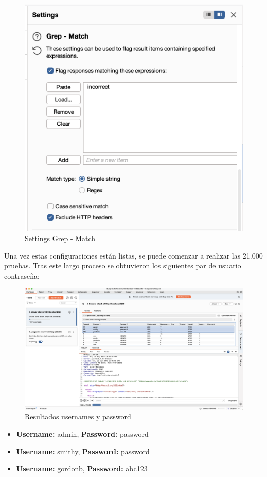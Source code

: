 \documentclass[letter,12pt]{article}
\begin{document}
\begin{itemize}
    \begin{figure}[H]
        \centering
        \includegraphics[width=0.5\linewidth]{Imagenes/brute_force_settings_match.png}
        \caption{Settings Grep - Match}
        \label{fig:placeholder}
    \end{figure}
\end{itemize}
Una vez estas configuraciones están listas, se puede comenzar a realizar las 21.000 pruebas.
Tras este largo proceso se obtuvieron los siguientes par de usuario contraseña:
\begin{figure}[H]
    \centering
    \includegraphics[width=1\linewidth]{Imagenes/brute_force_results.png}
    \caption{Resultados usernames y password}
    \label{fig:placeholder}
\end{figure}
\begin{itemize}
    \item \textbf{Username:} admin, \textbf{Password:} password
    \item \textbf{Username:} smithy, \textbf{Password:} password
    \item \textbf{Username:} gordonb, \textbf{Password:} abc123
\end{itemize}
\end{document}
